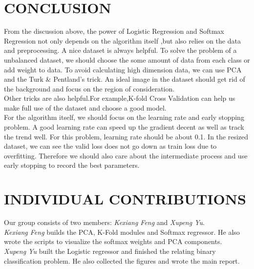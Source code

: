\documentclass{article} %
\begin{document}
\section {CONCLUSION}
From the discussion above, the power of Logistic Regression and Softmax Regression not only depends on the algorithm itself ,but also relies on the data and preprocessing.
A nice dataset is always helpful. To solve the problem of a unbalanced dataset, we should choose the some amount of data from each class or add weight to data. To avoid calculating high dimension data, we can use PCA and the Turk \& Pentland's trick. An ideal image in the dataset should get rid of the background and focus on the region of consideration.\\
Other tricks are also helpful.For example,K-fold Cross Validation can help us make full use of the dataset and choose a good model.\\
For the algorithm itself, we should focus on the learning rate and early stopping problem. A good learning rate can speed up the gradient decent as well as track the trend well. For this problem, learning rate should be about 0.1. In the resized dataset, we can see the valid loss does not go down as train loss due to overfitting. Therefore we should also care about the intermediate process and use early stopping to record the best parameters.
\section{INDIVIDUAL CONTRIBUTIONS}
Our group consists of two members: \textit{Kexiang Feng} and \textit{Xupeng Yu}. \\
\textit{Kexiang Feng} builds the PCA, K-Fold modules and Softmax regressor. He also wrote the scripts to visualize the softmax weights and PCA components. \\
\textit{Xupeng Yu} built the Logistic regressor and finished the relating binary classification problem. He also collected the figures and wrote the main report. 




\end{document}
